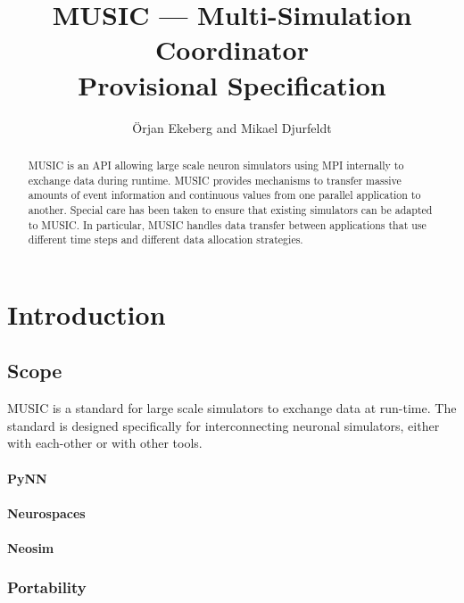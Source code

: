 \documentclass[a4paper]{report}
\begin{document}
\title{MUSIC --- Multi-Simulation Coordinator\\
  Provisional Specification}

\author{Örjan Ekeberg and Mikael Djurfeldt}

\maketitle

\begin{abstract}
  MUSIC is an API allowing large scale neuron simulators using MPI
  internally to exchange data during runtime.  MUSIC provides
  mechanisms to transfer massive amounts of event information and
  continuous values from one parallel application to another.  Special
  care has been taken to ensure that existing simulators can be
  adapted to MUSIC.  In particular, MUSIC handles data transfer
  between applications that use different time steps and different
  data allocation strategies.
\end{abstract}


\tableofcontents

\chapter{Introduction}

\section{Scope}

MUSIC is a standard for large scale simulators to exchange data at
run-time.  The standard is designed specifically for interconnecting
neuronal simulators, either with each-other or with other tools.

\subsubsection{PyNN}

\subsubsection{Neurospaces}

\subsubsection{Neosim}


\subsection{Portability}
\end{document}
